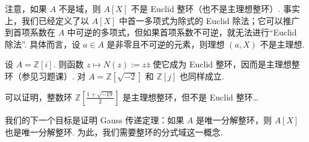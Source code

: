 注意，如果 $A$ 不是域，则 $A[X]$ 不是 Euclid 整环（也不是主理想整环）. 事实上，我们已经定义了以 $A[X]$ 中首一多项式为除式的 Euclid 除法；它可以推广到首项系数在 $A$ 中可逆的多项式，但如果首项系数不可逆，就无法进行``Euclid 除法''. 具体而言，设 $a\in A$ 是非零且不可逆的元素，则理想 $(a,X)$ 不是主理想.

\begin{example*}
设 $A=\mathbb Z[i]$. 则函数 $z\mapsto N(z):=z\bar z$ 使它成为 Euclid 整环，因而是主理想整环（参见习题课）. 对 $A=\mathbb Z[\sqrt{-2}]$ 和 $\mathbb Z[j]$ 也同样成立.
\end{example*}

\begin{remark*}
可以证明，整数环 $\mathbb Z[\frac{1+\sqrt{-19}}2]$ 是主理想整环，但不是 Euclid 整环\ldots
\end{remark*}

我们的下一个目标是证明 Gauss 传递定理：如果 $A$ 是唯一分解整环，则 $A[X]$ 也是唯一分解整环. 为此，我们需要整环的分式域这一概念.


